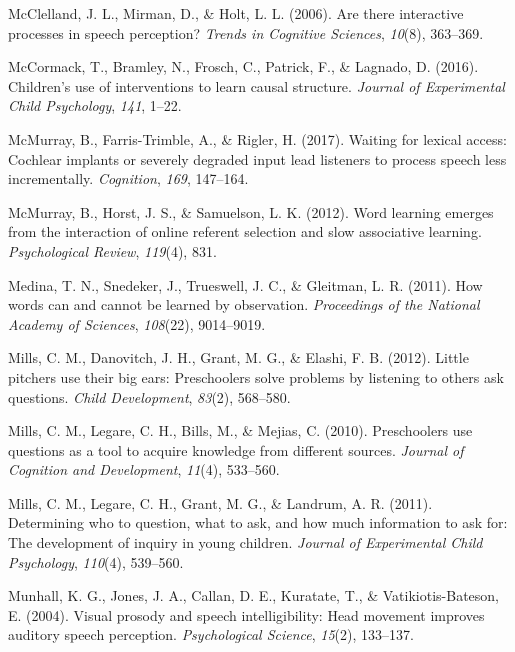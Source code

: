 \documentclass[oneside]{report}
\begin{document}
\hypertarget{ref-mcclelland2006there}{}
McClelland, J. L., Mirman, D., \& Holt, L. L. (2006). Are there
interactive processes in speech perception? \emph{Trends in Cognitive
Sciences}, \emph{10}(8), 363--369.

\hypertarget{ref-mccormack2016children}{}
McCormack, T., Bramley, N., Frosch, C., Patrick, F., \& Lagnado, D.
(2016). Children's use of interventions to learn causal structure.
\emph{Journal of Experimental Child Psychology}, \emph{141}, 1--22.

\hypertarget{ref-mcmurray2017waiting}{}
McMurray, B., Farris-Trimble, A., \& Rigler, H. (2017). Waiting for
lexical access: Cochlear implants or severely degraded input lead
listeners to process speech less incrementally. \emph{Cognition},
\emph{169}, 147--164.

\hypertarget{ref-mcmurray2012word}{}
McMurray, B., Horst, J. S., \& Samuelson, L. K. (2012). Word learning
emerges from the interaction of online referent selection and slow
associative learning. \emph{Psychological Review}, \emph{119}(4), 831.

\hypertarget{ref-medina2011words}{}
Medina, T. N., Snedeker, J., Trueswell, J. C., \& Gleitman, L. R.
(2011). How words can and cannot be learned by observation.
\emph{Proceedings of the National Academy of Sciences}, \emph{108}(22),
9014--9019.

\hypertarget{ref-mills2012little}{}
Mills, C. M., Danovitch, J. H., Grant, M. G., \& Elashi, F. B. (2012).
Little pitchers use their big ears: Preschoolers solve problems by
listening to others ask questions. \emph{Child Development},
\emph{83}(2), 568--580.

\hypertarget{ref-mills2010preschoolers}{}
Mills, C. M., Legare, C. H., Bills, M., \& Mejias, C. (2010).
Preschoolers use questions as a tool to acquire knowledge from different
sources. \emph{Journal of Cognition and Development}, \emph{11}(4),
533--560.

\hypertarget{ref-mills2011determining}{}
Mills, C. M., Legare, C. H., Grant, M. G., \& Landrum, A. R. (2011).
Determining who to question, what to ask, and how much information to
ask for: The development of inquiry in young children. \emph{Journal of
Experimental Child Psychology}, \emph{110}(4), 539--560.

\hypertarget{ref-munhall2004visual}{}
Munhall, K. G., Jones, J. A., Callan, D. E., Kuratate, T., \&
Vatikiotis-Bateson, E. (2004). Visual prosody and speech
intelligibility: Head movement improves auditory speech perception.
\emph{Psychological Science}, \emph{15}(2), 133--137.
\end{document}

